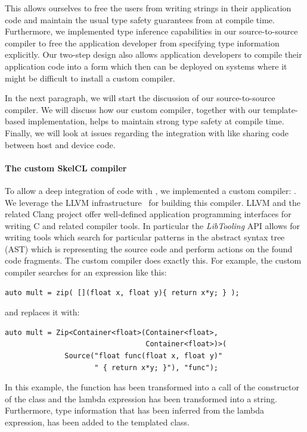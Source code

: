This allows ourselves to free the users from writing strings in their application code and maintain the usual type safety guarantees from \Cpp at compile time.
Furthermore, we implemented type inference capabilities in our source-to-source compiler to free the application developer from specifying type information explicitly.
Our two-step design also allows application developers to compile their application code into a form which then can be deployed on systems where it might be difficult to install a custom compiler.

In the next paragraph, we will start the discussion of our source-to-source compiler.
We will discuss how our custom compiler, together with our template-based implementation, helps to maintain strong type safety at compile time.
Finally, we will look at issues regarding the integration with \Cpp like sharing code between host and device code.

\paragraph{The custom SkelCL compiler}
To allow a deep integration of \SkelCL code with \Cpp, we implemented a custom compiler: .
We leverage the LLVM infrastructure~\cite{Lattner2004} for building this compiler.
LLVM and the related Clang project offer well-defined application programming interfaces for writing C and \Cpp related compiler tools.
In particular the \emph{LibTooling} API allows for writing tools which search for particular patterns in the abstract syntax tree (AST) which is representing the source code and perform actions on the found code fragments.
The  custom compiler does exactly this.
For example, the custom compiler searches for an expression like this:
\begin{lstlisting}[numbers=none,label={lst:skelclc:before},caption={\SkelCL code snippet before transformation.}]
auto mult = zip( [](float x, float y){ return x*y; } );
\end{lstlisting}
and replaces it with:
\smallskip
\begin{lstlisting}[numbers=none,label={lst:skelclc:after},caption={\SkelCL code snippet after transformation.}]
auto mult = Zip<Container<float>(Container<float>,
                                 Container<float>)>(
              Source("float func(float x, float y)"
                     " { return x*y; }"), "func");
\end{lstlisting}

In this example, the  function has been transformed into a call of the constructor of the  class and the lambda expression has been transformed into a string.
Furthermore, type information that has been inferred from the lambda expression, has been added to the templated  class.

